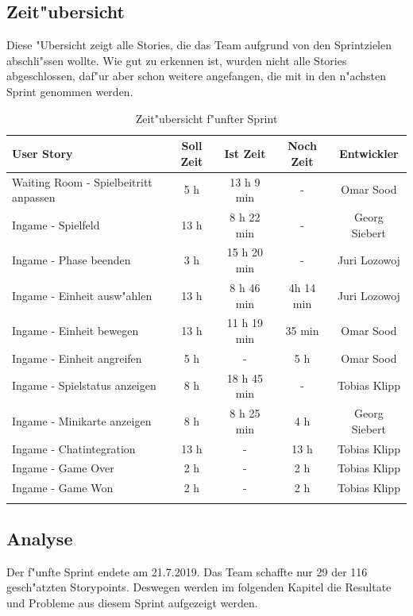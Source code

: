 \documentclass[12pt, titlepage]{scrartcl}
\begin{document}
        \subsection{Zeit"ubersicht}
        	Diese "Ubersicht zeigt alle Stories, die das Team aufgrund von den Sprintzielen abschli"ssen wollte. Wie gut zu erkennen ist, wurden nicht alle Stories abgeschlossen, daf"ur aber schon weitere angefangen, die mit in den n"achsten Sprint genommen werden.
        	\begin{longtable}[H]{p{6cm} c c c c }
        			\label{Time_1}
       				\textbf{User Story} & \textbf{Soll Zeit} & \textbf{Ist Zeit} & \textbf{Noch Zeit} & \textbf{Entwickler} \\
       				\toprule
       				\endhead
       				Waiting Room - Spielbeitritt anpassen & 5 h & 13 h 9 min & - & Omar Sood\\
       				Ingame - Spielfeld & 13 h & 8 h 22 min & - & Georg Siebert\\
       				Ingame - Phase beenden & 3 h & 15 h 20 min & - & Juri Lozowoj \\
       				Ingame - Einheit ausw"ahlen & 13 h & 8 h 46 min & 4h 14 min & Juri Lozowoj \\
       				Ingame - Einheit bewegen & 13 h & 11 h 19 min & 35 min & Omar Sood \\
       				Ingame - Einheit angreifen & 5 h & - & 5 h & Omar Sood \\
       				Ingame - Spielstatus anzeigen & 8 h & 18 h 45 min & - & Tobias Klipp \\
       				Ingame - Minikarte anzeigen & 8 h & 8 h 25 min & 4 h & Georg Siebert \\
       				Ingame - Chatintegration & 13 h & - & 13 h & Tobias Klipp \\
       				Ingame - Game Over & 2 h & - & 2 h & Tobias Klipp \\
       				Ingame - Game Won & 2 h & - & 2 h & Tobias Klipp \\
        			\caption{Zeit"ubersicht f"unfter Sprint}
        	\end{longtable}
        \subsection{Analyse}
        	Der f"unfte Sprint endete am 21.7.2019. Das Team schaffte nur 29 der 116 gesch"atzten Storypoints. Deswegen werden im folgenden Kapitel die Resultate und Probleme aus diesem Sprint aufgezeigt werden.
\end{document}
